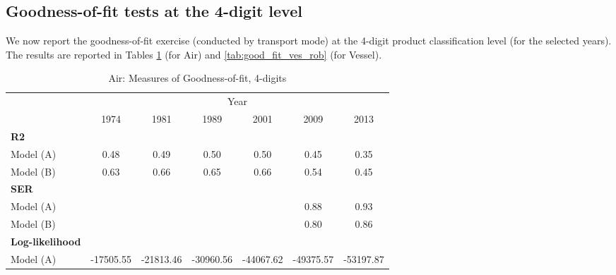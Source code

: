 \documentclass[a4paper,11pt]{article}
\begin{document}
\subsection{Goodness-of-fit tests at the 4-digit level}

We now report the goodness-of-fit exercise (conducted by transport mode) at the 4-digit product classification level (for the selected years). The results are reported in Tables \ref{tab:good_fit_air_rob} (for Air) and \ref{tab:good_fit_ves_rob} (for Vessel).
\begin{table}[htbp]
  \centering
  \caption{Air: Measures of Goodness-of-fit, 4-digits}
\begin{center}
\label{tab:good_fit_air_rob}%
\begin{tabular}{l|cccccc}
\hline
\hline
      & \multicolumn{6}{c}{Year}              \\
      & \multicolumn{1}{c}{1974} & \multicolumn{1}{c}{1981} & \multicolumn{1}{c}{1989} & \multicolumn{1}{c}{2001} & \multicolumn{1}{c}{2009} & \multicolumn{1}{c}{2013}  \\
\hline
\textbf{R2} & \multicolumn{1}{c}{} & \multicolumn{1}{c}{} & \multicolumn{1}{c}{} &       &       &      \\
Model (A)& \multicolumn{1}{c}{0.48} & \multicolumn{1}{c}{0.49} & \multicolumn{1}{c}{0.50} & \multicolumn{1}{c}{0.50} & \multicolumn{1}{c}{0.45} & \multicolumn{1}{c}{0.35} \\
Model (B) & \multicolumn{1}{c}{0.63} & \multicolumn{1}{c}{0.66} & \multicolumn{1}{c}{0.65} & \multicolumn{1}{c}{0.66} & \multicolumn{1}{c}{0.54} & \multicolumn{1}{c}{0.45} \\
\textbf{SER} & \multicolumn{1}{c}{} & \multicolumn{1}{c}{} & \multicolumn{1}{c}{} &       & \multicolumn{1}{c}{} & \multicolumn{1}{c}{}  \\
Model (A)& \multicolumn{1}{c}{} & \multicolumn{1}{c}{} & \multicolumn{1}{c}{} &       & \multicolumn{1}{c}{0.88} & \multicolumn{1}{c}{0.93}  \\
Model (B) & \multicolumn{1}{c}{} & \multicolumn{1}{c}{} & \multicolumn{1}{c}{} &       & \multicolumn{1}{c}{0.80} & \multicolumn{1}{c}{0.86}  \\
\textbf{Log-likelihood} & \multicolumn{1}{c}{} & \multicolumn{1}{c}{} & \multicolumn{1}{c}{} &       & \multicolumn{1}{c}{} & \multicolumn{1}{c}{} \\
Model (A) & \multicolumn{1}{c}{-17505.55} & \multicolumn{1}{c}{-21813.46} & \multicolumn{1}{c}{-30960.56} & \multicolumn{1}{c}{-44067.62} & \multicolumn{1}{c}{-49375.57} & \multicolumn{1}{c}{-53197.87}  \\

\end{tabular}
\end{center}
\end{table}
\end{document}
